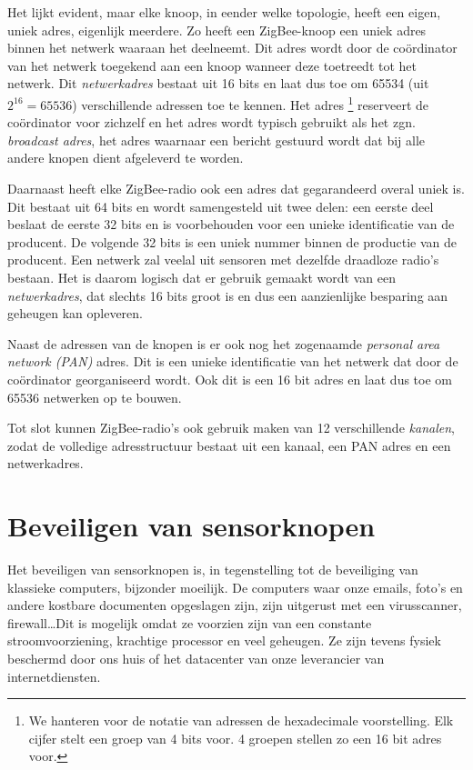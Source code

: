 Het lijkt evident, maar elke knoop, in eender welke topologie, heeft een eigen,
uniek adres, eigenlijk meerdere. Zo heeft een ZigBee-knoop een uniek adres
binnen het netwerk waaraan het deelneemt. Dit adres wordt door de co\"ordinator
van het netwerk toegekend aan een knoop wanneer deze toetreedt tot het netwerk.
Dit \emph{netwerkadres} bestaat uit 16 bits en laat dus toe om 65534 (uit
$2^{16} = 65536$) verschillende adressen toe te kennen. Het adres
\footnote{We hanteren voor de notatie van adressen de hexadecimale
voorstelling. Elk cijfer stelt een groep van 4 bits voor. 4 groepen stellen zo
een 16 bit adres voor.} reserveert de co\"ordinator voor zichzelf en het adres
 wordt typisch gebruikt als het zgn. \emph{broadcast adres}, het
adres waarnaar een bericht gestuurd wordt dat bij alle andere knopen dient
afgeleverd te worden.

Daarnaast heeft elke ZigBee-radio ook een adres dat gegarandeerd overal uniek
is. Dit bestaat uit 64 bits en wordt samengesteld uit twee delen: een eerste
deel beslaat de eerste 32 bits en is voorbehouden voor een unieke identificatie
van de producent. De volgende 32 bits is een uniek nummer binnen de productie
van de producent. Een netwerk zal veelal uit sensoren met dezelfde draadloze
radio's bestaan. Het is daarom logisch dat er gebruik gemaakt wordt van een
\emph{netwerkadres}, dat slechts 16 bits groot is en dus een aanzienlijke
besparing aan geheugen kan opleveren.

Naast de adressen van de knopen is er ook nog het zogenaamde \emph{personal
area network (PAN)} adres. Dit is een unieke identificatie van het netwerk dat
door de co\"ordinator georganiseerd wordt. Ook dit is een 16 bit adres en laat
dus toe om 65536 netwerken op te bouwen.

Tot slot kunnen ZigBee-radio's ook gebruik maken van 12 verschillende
\emph{kanalen}, zodat de volledige adresstructuur bestaat uit een kanaal, een
PAN adres en een netwerkadres.

\section{Beveiligen van sensorknopen}
\label{section:beveiligen}

Het beveiligen van sensorknopen is, in tegenstelling tot de beveiliging van
klassieke computers, bijzonder moeilijk. De computers waar onze emails, foto's
en andere kostbare documenten opgeslagen zijn, zijn uitgerust met een
virusscanner, firewall\dots Dit is mogelijk omdat ze voorzien zijn van een
constante stroomvoorziening, krachtige processor en veel geheugen. Ze zijn
tevens fysiek beschermd door ons huis of het datacenter van onze leverancier
van internetdiensten.

